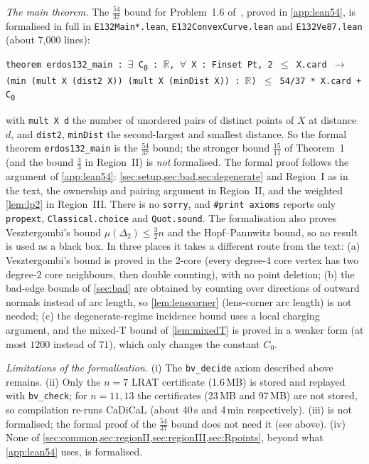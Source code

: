 \documentclass[11pt]{amsart}
\theoremstyle{definition}
\theoremstyle{remark}
\newcommand{\R}{\mathbb{R}}
\newcommand{\Dt}{\Delta_2}
\newcommand{\mult}{\mu}
\begin{document}
\emph{The main theorem.} The $\frac{54}{37}$ bound for Problem~1.6 of~\cite{CDL25}, proved in \cref{app:lean54}, is formalised in full in \texttt{E132Main*.lean}, \texttt{E132ConvexCurve.lean} and \texttt{E132Ve87.lean} (about 7{,}000 lines):
\begin{center}
\texttt{theorem erdos132\_main : $\exists$ C\textsubscript{0} : $\R$, $\forall$ X : Finset Pt, 2 $\le$ X.card $\to$ (min (mult X (dist2 X)) (mult X (minDist X)) : $\R$) $\le$ 54/37 * X.card + C\textsubscript{0}}
\end{center}
with \texttt{mult X d} the number of unordered pairs of distinct points of $X$ at distance $d$, and \texttt{dist2}, \texttt{minDist} the second-largest and smallest distance. So the formal theorem \texttt{erdos132\_main} is the $\frac{54}{37}$ bound; the stronger bound $\frac{15}{11}$ of Theorem~1 (and the bound $\frac43$ in Region~II) is \emph{not} formalised. The formal proof follows the argument of \cref{app:lean54}: \cref{sec:setup,sec:bad,sec:degenerate} and Region~I as in the text, the ownership and pairing argument in Region~II, and the weighted \cref{lem:lp2} in Region~III. There is no \texttt{sorry}, and \texttt{\#print\allowbreak{} axioms} reports only \texttt{propext}, \texttt{Classical.choice} and \texttt{Quot.sound}. The formalisation also proves Vesztergombi's bound $\mult(\Dt)\le\frac32n$ and the Hopf--Pannwitz bound, so no result is used as a black box. In three places it takes a different route from the text: (a) Vesztergombi's bound is proved in the $2$-core (every degree-$4$ core vertex has two degree-$2$ core neighbours, then double counting), with no point deletion; (b) the bad-edge bounds of \cref{sec:bad} are obtained by counting over directions of outward normals instead of arc length, so \cref{lem:lenscorner} (lens-corner arc length) is not needed; (c) the degenerate-regime incidence bound uses a local charging argument, and the mixed-T bound of \cref{lem:mixedT} is proved in a weaker form (at most $1200$ instead of $71$), which only changes the constant $C_0$.

\emph{Limitations of the formalisation.} (i) The \texttt{bv\_decide} axiom described above remains. (ii) Only the $n=7$ LRAT certificate (1.6\,MB) is stored and replayed with \texttt{bv\_check}; for $n=11,13$ the certificates (23\,MB and 97\,MB) are not stored, so compilation re-runs CaDiCaL (about 40\,s and 4\,min respectively). (iii)  is not formalised; the formal proof of the $\frac{54}{37}$ bound does not need it (see above). (iv) None of \cref{sec:common,sec:regionII,sec:regionIII,sec:Rpoints}, beyond what \cref{app:lean54} uses, is formalised.
\end{document}
